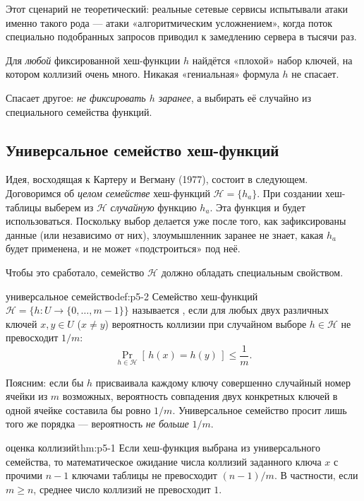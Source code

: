 Этот сценарий не теоретический: реальные сетевые сервисы испытывали атаки именно такого рода --- атаки «алгоритмическим усложнением», когда поток специально подобранных запросов приводил к замедлению сервера в тысячи раз.

\begin{importantbox}[title={Важно: принципиальное наблюдение}]
Для \emph{любой} фиксированной хеш-функции $h$ найдётся «плохой» набор ключей, на котором коллизий очень много. Никакая «гениальная» формула $h$ не спасает.

Спасает другое: \emph{не фиксировать $h$ заранее}, а выбирать её случайно из специального семейства функций.
\end{importantbox}

\subsection{Универсальное семейство хеш-функций}

Идея, восходящая к Картеру и Вегману (1977), состоит в следующем. Договоримся об \emph{целом семействе} хеш-функций $\mathcal{H} = \{h_a\}$. При создании хеш-таблицы выберем из $\mathcal{H}$ \emph{случайную} функцию $h_a$. Эта функция и будет использоваться. Поскольку выбор делается уже после того, как зафиксированы данные (или независимо от них), злоумышленник заранее не знает, какая $h_a$ будет применена, и не может «подстроиться» под неё.

Чтобы это сработало, семейство $\mathcal{H}$ должно обладать специальным свойством.

\begin{definition}{универсальное семейство}{def:p5-2}
Семейство хеш-функций $\mathcal{H} = \{h: U \to \{0, \dots, m-1\}\}$ называется , если для любых двух различных ключей $x, y \in U$ ($x \ne y$) вероятность коллизии при случайном выборе $h \in \mathcal{H}$ не превосходит $1/m$:
\[
  \Pr_{h \in \mathcal{H}}[\,h(x) = h(y)\,] \le \frac{1}{m}.
\]
\end{definition}

Поясним: если бы $h$ присваивала каждому ключу совершенно случайный номер ячейки из $m$ возможных, вероятность совпадения двух конкретных ключей в одной ячейке составила бы ровно $1/m$. Универсальное семейство просит лишь того же порядка --- вероятность \emph{не больше} $1/m$.

\begin{theorem}{оценка коллизий}{thm:p5-1}
Если хеш-функция выбрана из универсального семейства, то математическое ожидание числа коллизий заданного ключа $x$ с прочими $n - 1$ ключами таблицы не превосходит $(n-1)/m$. В частности, если $m \ge n$, среднее число коллизий не превосходит $1$.
\end{theorem}

